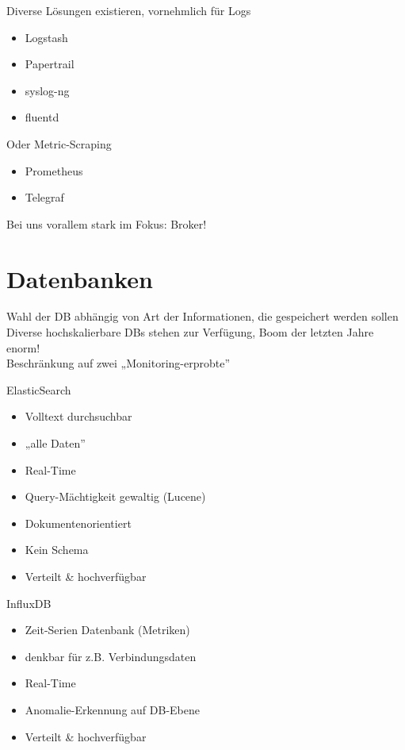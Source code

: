 \documentclass{beamer}
\begin{document}
\begin{frame}{\insertsection}
	Diverse Lösungen existieren, vornehmlich für Logs
	\begin{itemize}
		\item Logstash
		\item Papertrail
		\item syslog-ng
		\item fluentd
	\end{itemize}
	Oder Metric-Scraping
	\begin{itemize}
		\item Prometheus
		\item Telegraf
	\end{itemize}
	Bei uns vorallem stark im Fokus: Broker!
\end{frame}


\section{Datenbanken}


\begin{frame}{\insertsection}
	\fontsize{20pt}{20pt}\selectfont
	Wahl der DB abhängig von Art der Informationen, die gespeichert werden sollen\\
	\vspace{2em}
	\fontsize{14pt}{14pt}\selectfont
	Diverse hochskalierbare DBs stehen zur Verfügung, Boom der letzten Jahre enorm!\\
	\vspace{1em}
	Beschränkung auf zwei „Monitoring-erprobte”
\end{frame}


\begin{frame}{ElasticSearch}
	\begin{itemize}
		\setlength\itemsep{1em}
		\item Volltext durchsuchbar
		\item „alle Daten”
		\item Real-Time
		\item Query-Mächtigkeit gewaltig (Lucene)
		\item Dokumentenorientiert
		\item Kein Schema
		\item Verteilt \& hochverfügbar
	\end{itemize}
\end{frame}

\begin{frame}{InfluxDB}
	\begin{itemize}
		\setlength\itemsep{1em}
		\item Zeit-Serien Datenbank (Metriken)
		\item denkbar für z.B. Verbindungsdaten
		\item Real-Time
		\item Anomalie-Erkennung auf DB-Ebene
		\item Verteilt \& hochverfügbar
	\end{itemize}
\end{frame}
\end{document}
